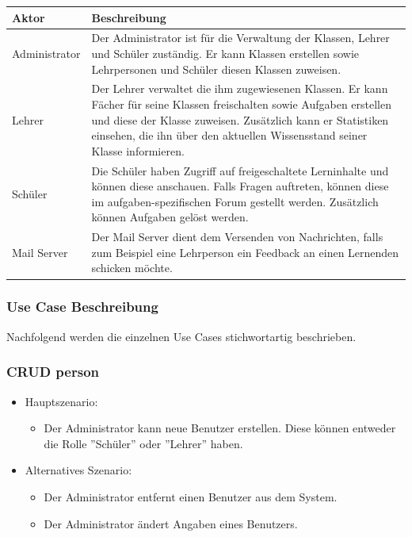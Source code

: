 \renewcommand{\arraystretch}{1.2}
\begin{table}[H]
	\centering
	\begin{tabu} to 0.9\textwidth {l X}
	\toprule
	Aktor & Beschreibung \\ 
	\midrule
	Administrator & Der Administrator ist für die Verwaltung der Klassen, Lehrer und Schüler zuständig. Er kann Klassen erstellen sowie Lehrpersonen und Schüler diesen Klassen zuweisen. \\
	\midrule
	Lehrer & Der Lehrer verwaltet die ihm zugewiesenen Klassen. Er kann Fächer für seine Klassen freischalten sowie Aufgaben erstellen und diese der Klasse zuweisen. Zusätzlich kann er Statistiken einsehen, die ihn über den aktuellen Wissensstand seiner Klasse informieren. \\
	\midrule
	Schüler & Die Schüler haben Zugriff auf freigeschaltete Lerninhalte und können diese anschauen. Falls Fragen auftreten, können diese im aufgaben-spezifischen Forum gestellt werden. Zusätzlich können Aufgaben gelöst werden. \\
	\midrule
	Mail Server & Der Mail Server dient dem Versenden von Nachrichten, falls zum Beispiel eine Lehrperson ein Feedback an einen Lernenden schicken möchte. \\
	\bottomrule
	\end{tabu}
	\label{aktoren}
\end{table}


\subsubsection{Use Case Beschreibung}
Nachfolgend werden die einzelnen Use Cases stichwortartig beschrieben. 
\subsubsection*{CRUD person}

\begin{itemize}
	\item Hauptszenario:
	\begin{itemize}
		\item Der Administrator kann neue Benutzer erstellen. Diese können entweder die Rolle ''Schüler'' oder ''Lehrer'' haben.
	\end{itemize}
	\item Alternatives Szenario:
	\begin{itemize}
		\item Der Administrator entfernt einen Benutzer aus dem System.
		\item Der Administrator ändert Angaben eines Benutzers.
	\end{itemize}
\end{itemize}

